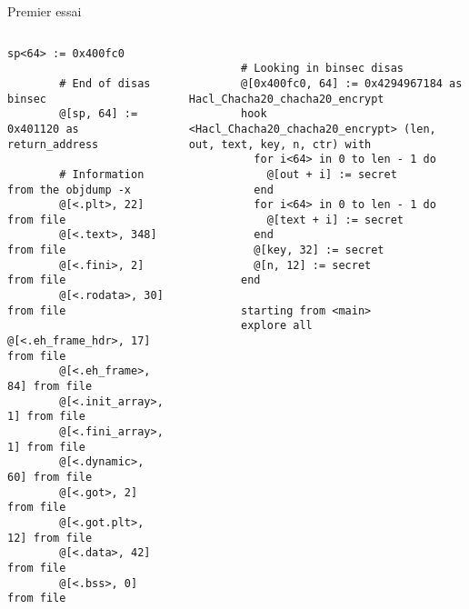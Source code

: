 \documentclass[A4,svgnames,9pt,aspectratio=169]{beamer}
\begin{document}

\begin{frame}[fragile]{Premier essai}
  \begin{columns}
    \begin{column}{0.5\textwidth}
      \begin{lstlisting}[style=INIStyle, gobble=8]
        sp<64> := 0x400fc0

        # End of disas binsec
        @[sp, 64] := 0x401120 as return_address

        # Information from the objdump -x
        @[<.plt>, 22] from file
        @[<.text>, 348] from file
        @[<.fini>, 2] from file
        @[<.rodata>, 30] from file
        @[<.eh_frame_hdr>, 17] from file
        @[<.eh_frame>, 84] from file
        @[<.init_array>, 1] from file
        @[<.fini_array>, 1] from file
        @[<.dynamic>, 60] from file
        @[<.got>, 2] from file
        @[<.got.plt>, 12] from file
        @[<.data>, 42] from file
        @[<.bss>, 0] from file
        \end{lstlisting}      
    \end{column}
    \begin{column}{0.5\textwidth}
      \begin{lstlisting}[style=INIStyle, caption={something\_like\_that.ini}, gobble=8]

        # Looking in binsec disas
        @[0x400fc0, 64] := 0x4294967184 as Hacl_Chacha20_chacha20_encrypt
        hook <Hacl_Chacha20_chacha20_encrypt> (len, out, text, key, n, ctr) with
          for i<64> in 0 to len - 1 do
            @[out + i] := secret
          end
          for i<64> in 0 to len - 1 do
            @[text + i] := secret
          end
          @[key, 32] := secret
          @[n, 12] := secret
        end

        starting from <main>
        explore all
      \end{lstlisting}
      
    \end{column}
  \end{columns}
  
\end{frame}

\end{document}
